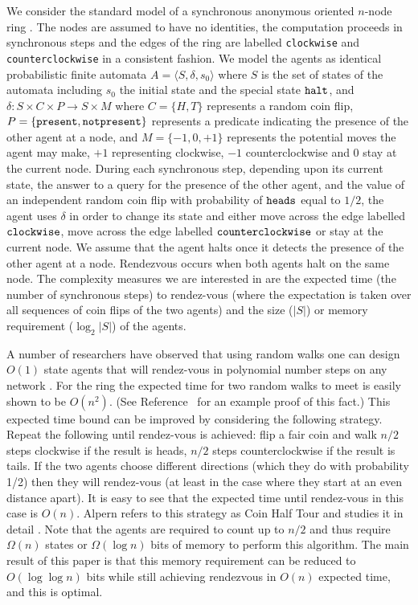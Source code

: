 \documentclass[lotsofwhite]{patmorin}
\begin{document}
We consider the standard model of a synchronous anonymous oriented
$n$-node ring \cite{santoro}. The nodes are assumed to have no
identities, the computation proceeds in synchronous steps and the
edges of the ring are labelled {\tt clockwise} and {\tt
counterclockwise} in a consistent fashion.  We model the agents as
identical probabilistic finite automata $A = \langle S, \delta, s_0
\rangle$ where
$S$ is the set of states of the automata including $s_0$ the initial
state and the special state ${\tt halt}$, and $\delta:S \times C
\times P \to S \times M$ where $C = \{ H, T \}$ represents a random
coin flip, $P = \{ \tt present, notpresent \}$ represents a predicate
indicating the presence of the other agent at a node, and $M = \{ -1,
0, +1 \}$ represents the potential moves the agent may make, $+1$
representing clockwise, $-1$ counterclockwise and $0$ stay at the
current node.  During each synchronous step, depending upon its
current state, the answer to a query for the presence of the other
agent, and the value of an independent random coin flip with
probability of $\tt heads$ equal to $1/2$, the agent uses $\delta$ in
order to change its state and either move across the edge labelled $\tt
clockwise$, move across the edge labelled $\tt counterclockwise$ or
stay at the current node. We assume that the
agent halts once it detects the presence of the other agent at a node.
Rendezvous occurs when both agents halt on the same node.  The
complexity measures  we are interested in are the expected time (the
number of synchronous steps) to rendez-vous (where the expectation is
taken over all sequences of coin flips of the two agents) and the size
($|S|$) or memory requirement ($\log_2 |S|$) of the agents.  

A number of researchers have observed that using random walks one can
design $O(1)$ state agents that will rendez-vous in polynomial number
steps on any network \cite{coppersmith}. For the ring the expected
time for two random walks to meet is easily shown to be $O(n^2)$. (See
Reference~\cite{kk} for an example proof of this fact.) This expected time bound
can be improved by considering the following strategy.  Repeat the
following until rendez-vous is achieved: flip a fair coin and walk
$n/2$ steps clockwise if the result is heads, $n/2$ steps
counterclockwise if the result is tails.  If the two agents choose
different directions (which they do with probability 1/2) then they
will rendez-vous (at least in the case where they start at an even
distance apart).  It is easy to see that the expected time until
rendez-vous in this case is $O(n)$. Alpern refers to this strategy as
Coin Half Tour and studies it in detail \cite{alpern95}.  Note that
the agents are required to count up to $n/2$ and thus require $\Omega(n)$
states or $\Omega(\log n)$ bits of memory to perform this algorithm. 
The main result of this paper is that this memory requirement can be
reduced to $O(\log\log n)$ bits while still achieving rendezvous in
$O(n)$ expected time, and this is optimal.
\end{document}
